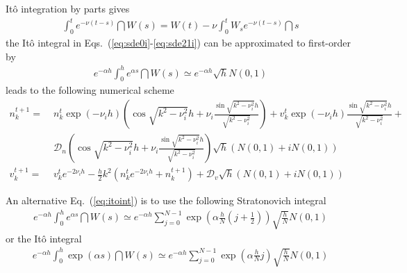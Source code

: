 \documentclass[10pt,a4paper]{article}
\newcommand{\eq}[1]{Eq.~(#1)}
\newcommand{\eqs}[1]{Eqs.~(#1)}
\newcommand{\src}{\ensuremath{\mathcal{D}}}
\def\knui{\sqrt{k^2{-}\nu_i^2}}
\begin{document}
Itô integration by parts gives
\begin{align}
\int_0^te^{-\nu(t{-}s)}\dint{W(s)} = W(t) -\nu\int_0^tW_se^{-\nu(t{-}s)}\dint{s}
\end{align}
the Itô integral in \eqs{\ref{eq:sde0i}-\ref{eq:sde21i}}
can be approximated to first-order by
\begin{align}
e^{-\alpha h}\int_0^h e^{\alpha s}\dint{W(s)}\simeq e^{-\alpha h}\sqrt{h}N(0,1)
\label{eq:itoint}
\end{align}
leads to the following numerical scheme
\begin{align}
n_k^{t+1}=&\;n_k^t\exp(-\nu_ih)\left(\cos\knui h+
\nu_i\frac{\sin\knui h}{\knui}\right)+%
v_k^t\exp(-\nu_ih)\frac{\sin\knui h}{\knui}+\nonumber\\
&\;\src_n\left(\cos\knui h+\nu_i\frac{\sin\knui h}{\knui}\right)
\sqrt{h}\left(N(0,1)+iN(0,1)\right)
\label{eq:sde20numa}\\
v_k^{t+1}=&\;v_k^t e^{-2\nu_ih}-\frac{h}{2}k^2\left(n_k^t
e^{-2\nu_ih}+n_k^{t+1}\right)+%
\src_v\sqrt{h}\left(N(0,1)+iN(0,1)\right)
\label{eq:sde21numa}
\end{align}

An alternative \eq{\ref{eq:itoint}} is to use the following
Stratonovich integral
\begin{align}
e^{-\alpha h}\int_0^h e^{\alpha s}\dint{W(s)}\simeq
e^{-\alpha h}\sum_{j=0}^{N-1}\exp\left(\alpha\frac{h}{N}
\left(j+\frac{1}{2}\right)\right)
\sqrt{\frac{h}{N}}N(0,1)
\label{eq:stratoint}
\end{align}
or the Itô integral
\begin{align}
e^{-\alpha h}\int_0^h \exp(\alpha s )\dint{W(s)}\simeq
e^{-\alpha h}\sum_{j=0}^{N-1}\exp\left(\alpha\frac{h}{N}j\right)
\sqrt{\frac{h}{N}}N(0,1)
\label{eq:itoint2}
\end{align}
\end{document}
